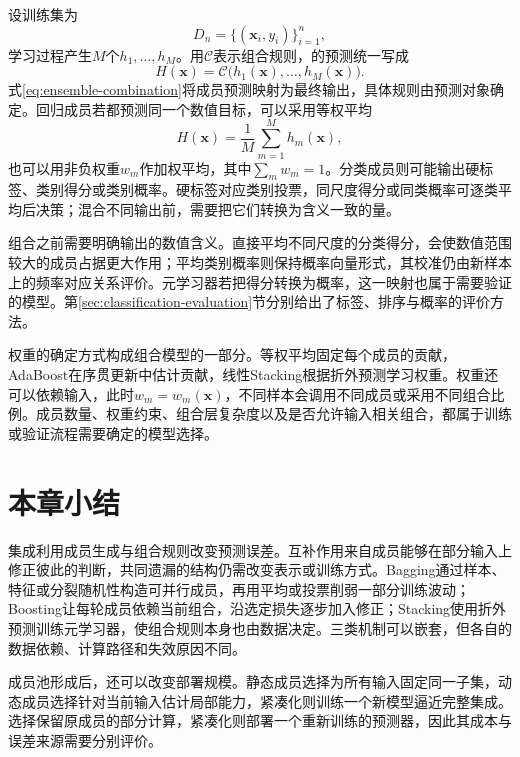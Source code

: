 设训练集为
\[
  D_n=\{(\bm{x}_i,y_i)\}_{i=1}^{n},
\]
学习过程产生$M$个$h_1,\ldots,h_M$。用$\mathcal{C}$表示组合规则，的预测统一写成
\begin{equation}
  H(\bm{x})
  =\mathcal{C}\bigl(h_1(\bm{x}),\ldots,h_M(\bm{x})\bigr).
  \label{eq:ensemble-combination}
\end{equation}
式\eqref{eq:ensemble-combination}将成员预测映射为最终输出，具体规则由预测对象确定。回归成员若都预测同一个数值目标，可以采用等权平均
\[
  H(\bm{x})=\frac{1}{M}\sum_{m=1}^{M}h_m(\bm{x}),
\]
也可以用非负权重$w_m$作加权平均，其中$\sum_m w_m=1$。分类成员则可能输出硬标签、类别得分或类别概率。硬标签对应类别投票，同尺度得分或同类概率可逐类平均后决策；混合不同输出前，需要把它们转换为含义一致的量。

组合之前需要明确输出的数值含义。直接平均不同尺度的分类得分，会使数值范围较大的成员占据更大作用；平均类别概率则保持概率向量形式，其校准仍由新样本上的频率对应关系评价。元学习器若把得分转换为概率，这一映射也属于需要验证的模型。第\ref{sec:classification-evaluation}节分别给出了标签、排序与概率的评价方法。

权重的确定方式构成组合模型的一部分。等权平均固定每个成员的贡献，AdaBoost在序贯更新中估计贡献，线性Stacking根据折外预测学习权重。权重还可以依赖输入，此时$w_m=w_m(\bm{x})$，不同样本会调用不同成员或采用不同组合比例。成员数量、权重约束、组合层复杂度以及是否允许输入相关组合，都属于训练或验证流程需要确定的模型选择。








\section{本章小结}
\label{sec:ensemble-summary}

集成利用成员生成与组合规则改变预测误差。互补作用来自成员能够在部分输入上修正彼此的判断，共同遗漏的结构仍需改变表示或训练方式。Bagging通过样本、特征或分裂随机性构造可并行成员，再用平均或投票削弱一部分训练波动；Boosting让每轮成员依赖当前组合，沿选定损失逐步加入修正；Stacking使用折外预测训练元学习器，使组合规则本身也由数据决定。三类机制可以嵌套，但各自的数据依赖、计算路径和失效原因不同。

成员池形成后，还可以改变部署规模。静态成员选择为所有输入固定同一子集，动态成员选择针对当前输入估计局部能力，紧凑化则训练一个新模型逼近完整集成。选择保留原成员的部分计算，紧凑化则部署一个重新训练的预测器，因此其成本与误差来源需要分别评价。


